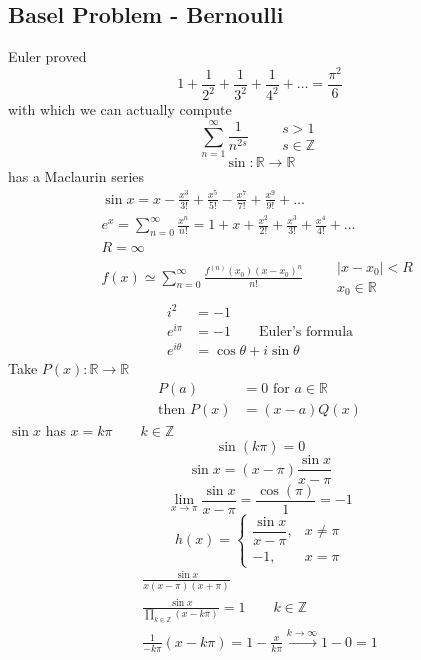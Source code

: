 \documentclass[letterpaper, 12pt]{article}
\newcommand{\Z}{\mathbb{Z}}
\newcommand{\R}{\mathbb{R}}
\newcommand{\0}{\emptyset}
\begin{document}
    \subsection*{Basel Problem - Bernoulli}
    Euler proved 
    \[1 + \frac{1}{2^2} + \frac{1}{3^2} + \frac{1}{4^2} + \dots 
    = \frac{\pi^2}{6}\]
    with which we can actually compute 
    \[\sum_{n=1}^{\infty} \frac{1}{n^{2s}} \qquad \begin{aligned}
        s > 1 \\
        s \in \Z
    \end{aligned}\]
    \[\sin : \R \to \R\]
    has a Maclaurin series
    \begin{gather*}
        \sin x = x - \frac{x^3}{3!} + \frac{x^5}{5!} - \frac{x^7}{7!} + \frac{x^9}{9!} + \dots \\
        e^x = \sum_{n=0}^{\infty} \frac{x^n}{n!} = 1 + x + \frac{x^2}{2!} + \frac{x^3}{3!} + \frac{x^4}{4!} + \dots \\
        R = \infty \\
        f(x) \simeq \sum_{n=0}^{\infty} \frac{f^{(n)}(x_0)(x-x_0)^n}{n!} \qquad \begin{aligned}
            |x-x_0|< R \\
            x_0 \in \R
        \end{aligned}
    \end{gather*}
    \begin{align*}
        i^2 &= -1 \\
        e^{i\pi} &= -1 \qquad \text{Euler's formula} \\
        e^{i\theta} &= \cos \theta + i \sin \theta
    \end{align*}
    Take $P(x) : \R \to \R$
    \begin{align*}
        P(a) &= 0 \text{ for } a \in \R \\
        \text{then } P(x) &= (x-a)Q(x)
    \end{align*}
    $\sin x$ has $x = k\pi \qquad k \in \Z$
    \[\sin(k\pi) = 0\]
    \[\sin x = (x - \pi)\frac{\sin x}{x-\pi}\]
    \[\lim_{x \to \pi} \frac{\sin x}{x-\pi} = \frac{\cos(\pi)}{1} = -1\]
    \[h(x) = \begin{cases}
        \dfrac{\sin x}{x-\pi}, & x \ne \pi \\
        -1, & x = \pi
    \end{cases}\]
    \begin{gather*}
        \frac{\sin x}{x(x-\pi)(x+\pi)} \\
        \frac{\sin x}{\prod_{k \in \Z} (x - k\pi)} = 1 \qquad k \in \Z \\
        \frac{1}{-k\pi} (x - k\pi) = 1 - \frac{x}{k\pi} \xrightarrow{k\to\infty} 1-0=1
    \end{gather*}
\end{document}
